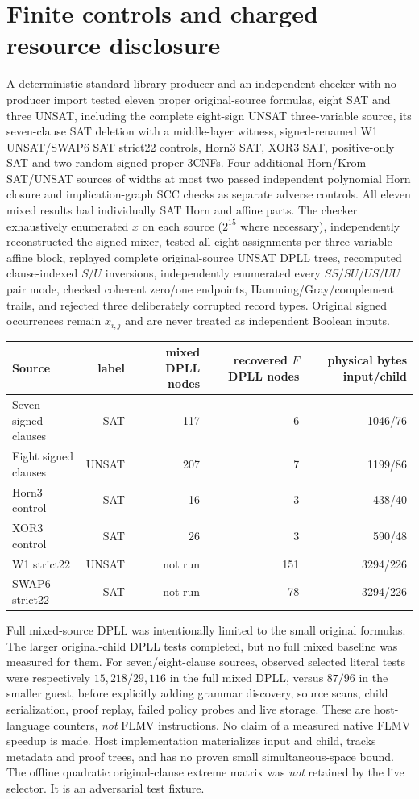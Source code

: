 \documentclass[11pt]{article}
\begin{document}
\section{Finite controls and charged resource disclosure}
A deterministic standard-library producer and an independent checker with no producer import tested eleven proper original-source formulas, eight SAT and three UNSAT, including the complete eight-sign UNSAT three-variable source, its seven-clause SAT deletion with a middle-layer witness, signed-renamed W1 UNSAT/SWAP6 SAT strict22 controls, Horn3 SAT, XOR3 SAT, positive-only SAT and two random signed proper-3CNFs. Four additional Horn/Krom SAT/UNSAT sources of widths at most two passed independent polynomial Horn closure and implication-graph SCC checks as separate adverse controls. All eleven mixed results had individually SAT Horn and affine parts. The checker exhaustively enumerated $x$ on each source ($2^{15}$ where necessary), independently reconstructed the signed mixer, tested all eight assignments per three-variable affine block, replayed complete original-source UNSAT DPLL trees, recomputed clause-indexed $S/U$ inversions, independently enumerated every $SS/SU/US/UU$ pair mode, checked coherent zero/one endpoints, Hamming/Gray/complement trails, and rejected three deliberately corrupted record types. Original signed occurrences remain $x_{i,j}$ and are never treated as independent Boolean inputs.

\begin{center}\begin{tabular}{lrrrr}
\toprule
Source & label & mixed DPLL nodes & recovered $F$ DPLL nodes & physical bytes input/child\\\midrule
Seven signed clauses & SAT &117&6&1046/76\\
Eight signed clauses & UNSAT &207&7&1199/86\\
Horn3 control & SAT &16&3&438/40\\
XOR3 control & SAT &26&3&590/48\\
W1 strict22 & UNSAT &not run&151&3294/226\\
SWAP6 strict22 & SAT &not run&78&3294/226\\
\bottomrule\end{tabular}\end{center}
Full mixed-source DPLL was intentionally limited to the small original formulas. The larger original-child DPLL tests completed, but no full mixed baseline was measured for them. For seven/eight-clause sources, observed selected literal tests were respectively $15{,}218/29{,}116$ in the full mixed DPLL, versus $87/96$ in the smaller guest, before explicitly adding grammar discovery, source scans, child serialization, proof replay, failed policy probes and live storage. These are host-language counters, \emph{not} FLMV instructions. No claim of a measured native FLMV speedup is made. Host implementation materializes input and child, tracks metadata and proof trees, and has no proven small simultaneous-space bound. The offline quadratic original-clause extreme matrix was \emph{not} retained by the live selector. It is an adversarial test fixture.
\end{document}
